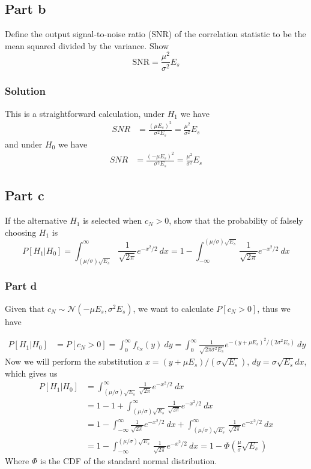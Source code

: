 \documentclass[a4paper]{article}
\begin{document}
\subsection*{Part b}%
Define the output signal-to-noise ratio (SNR) of the correlation statistic to be the mean squared divided by the variance. Show
\[
  \text{SNR} = \frac{\mu^2}{\sigma^2}E_s
\]

\subsubsection*{Solution}%
This is a straightforward calculation, under $H_1$ we have
\[
  \begin{aligned}
    SNR &= \frac{(\mu E_s)^2}{\sigma^2 E_s} = \frac{\mu^2}{\sigma^2}E_s
  \end{aligned}
\]
and under $H_0$ we have
\[
  \begin{aligned}
    SNR &= \frac{(-\mu E_s)^2}{\sigma^2 E_s} = \frac{\mu^2}{\sigma^2}E_s
  \end{aligned}
\]

\subsection*{Part c}%
If the alternative $H_1$ is selected when $c_N > 0$, show that the probability of falsely choosing $H_1$ is
\[
  P[H_1 | H_0] = \int_{(\mu/\sigma)\sqrt{E_s}}^{\infty} \frac{1}{\sqrt{2\pi}} e^{-x^2/2}\ dx = 1 - \int^{(\mu/\sigma)\sqrt{E_s}}_{-\infty} \frac{1}{\sqrt{2\pi}} e^{-x^2/2}\ dx 
\]

\subsubsection*{Part d}%
Given that $c_N \sim \mathcal{N}(-\mu E_s, \sigma^2 E_s)$, we want to calculate $P[c_N > 0]$, thus we have

\[
  \begin{aligned}
    P[H_1 | H_0] &= P[c_N > 0] = \int_{0}^{\infty} f_{c_N}(y)\ dy = \int_{0}^{\infty} \frac{1}{\sqrt{2\pi \sigma^2 E_s}} e^{-(y + \mu E_s)^2/(2 \sigma^2 E_s)}\ dy
  \end{aligned}
\]
Now we will perform the substitution $x = (y + \mu E_s)/(\sigma \sqrt{E_s})$, $dy = \sigma \sqrt{E_s} dx$, which gives us
\[
  \begin{aligned}
    P[H_1| H_0] &= \int_{(\mu/\sigma)\sqrt{E_s}}^{\infty} \frac{1}{\sqrt{2 \pi}} e^{-x^2/2}\ dx \\
                &= 1 - 1 + \int_{(\mu/\sigma)\sqrt{E_s}}^{\infty} \frac{1}{\sqrt{2 \pi}} e^{-x^2/2}\ dx \\
                &= 1 - \int_{-\infty}^{\infty} \frac{1}{\sqrt{2 \pi}} e^{-x^2/2}\ dx + \int_{(\mu/\sigma)\sqrt{E_s}}^{\infty} \frac{1}{\sqrt{2 \pi}} e^{-x^2/2}\ dx \\
                &= 1 - \int_{-\infty}^{(\mu/\sigma)\sqrt{E_s}} \frac{1}{\sqrt{2 \pi}} e^{-x^2/2}\ dx = 1 - \Phi \left(\frac{\mu}{\sigma}\sqrt{E_s}\right)
  \end{aligned}
\]
Where $\Phi$ is the CDF of the standard normal distribution.
\end{document}
